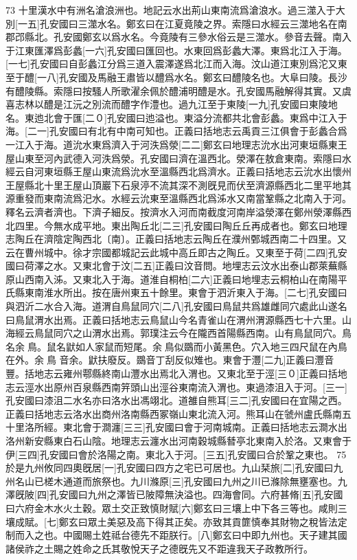 73
十里漢水中有洲名滄浪洲也。地記云水出荊山東南流爲滄浪水。過三澨入于大別[一五]孔安國曰三澨水名。鄭玄曰在江夏竟陵之界。索隱曰水經云三澨地名在南郡邔縣北。孔安國鄭玄以爲水名。今竟陵有三參水俗云是三澨水。參音去聲。南入于江東匯澤爲彭蠡[一六]孔安國曰匯回也。水東回爲彭蠡大澤。東爲北江入于海。[一七]孔安國曰自彭蠡江分爲三道入震澤遂爲北江而入海。汶山道江東別爲沱又東至于醴[一八]孔安國及馬融王肅皆以醴爲水名。鄭玄曰醴陵名也。大阜曰陵。長沙有醴陵縣。索隱曰按騷人所歌濯余佩於醴浦明醴是水。孔安國馬融解得其實。又虞喜志林以醴是江沅之別流而醴字作澧也。過九江至于東陵[一九]孔安國曰東陵地名。東迆北會于匯[二０]孔安國曰迆溢也。東溢分流都共北會彭蠡。東爲中江入于海。[二一]孔安國曰有北有中南可知也。正義曰括地志云禹貢三江俱會于彭蠡合爲一江入于海。道沇水東爲濟入于河泆爲滎[二二]鄭玄曰地理志沇水出河東垣縣東王屋山東至河內武德入河泆爲滎。孔安國曰濟在溫西北。滎澤在敖倉東南。索隱曰水經云自河東垣縣王屋山東流爲沇水至溫縣西北爲濟水。正義曰括地志云沇水出懷州王屋縣北十里王屋山頂巖下石泉渟不流其深不測旣見而伏至濟源縣西北二里平地其源重發而東南流爲汜水。水經云沇東至溫縣西北爲泲水又南當鞏縣之北南入于河。釋名云濟者濟也。下濟子細反。按濟水入河而南截度河南岸溢滎澤在鄭州滎澤縣西北四里。今無水成平地。東出陶丘北[二三]孔安國曰陶丘丘再成者也。鄭玄曰地理志陶丘在濟陰定陶西北〔南〕。正義曰括地志云陶丘在濮州鄄城西南二十四里。又云在曹州城中。徐才宗國都城記云此城中高丘即古之陶丘。又東至于荷[二四]孔安國曰荷澤之水。又東北會于汶[二五]正義曰汶音問。地埋志云汶水出泰山郡萊蕪縣原山西南入泲。又東北入于海。道淮自桐柏[二六]正義曰地埋志云桐柏山在南陽平氏縣東南淮水所出。按在唐州東五十餘里。東會于泗沂東入于海。[二七]孔安國曰與泗沂二水合入海。道渭自鳥鼠同穴[二八]孔安國曰鳥鼠共爲雄雌同穴處此山遂名曰鳥鼠渭水出焉。正義曰括地志云鳥鼠山今名青雀山在渭州渭源縣西七十六里。山海經云鳥鼠同穴之山渭水出焉。郭璞注云今在隴西首陽縣西南。山有鳥鼠同穴。鳥名余鳥。鼠名鼣如人家鼠而短尾。余鳥似鵽而小黃黑色。穴入地三四尺鼠在內鳥在外。余鳥 音余。鼣扶廢反。鵽音丁刮反似雉也。東會于灃[二九]正義曰灃音豐。括地志云雍州鄠縣終南山灃水出焉北入渭也。又東北至于涇[三０]正義曰括地志云涇水出原州百泉縣西南笄頭山出涇谷東南流入渭也。東過漆沮入于河。[三一]孔安國曰漆沮二水名亦曰洛水出馮翊北。道雒自熊耳[三二]孔安國曰在宜陽之西。正義曰括地志云洛水出商州洛南縣西冢嶺山東北流入河。熊耳山在虢州盧氏縣南五十里洛所經。東北會于澗瀍[三三]孔安國曰會于河南城南。正義曰括地志云澗水出洛州新安縣東白石山陰。地理志云瀍水出河南穀城縣朁亭北東南入於洛。又東會于伊[三四]孔安國曰會於洛陽之南。東北入于河。[三五]孔安國曰合於鞏之東也。
75
於是九州攸同四奧旣居[一]孔安國曰四方之宅已可居也。九山栞旅[二]孔安國曰九州名山已槎木通道而旅祭也。九川滌原[三]孔安國曰九州之川已滌除無壅塞也。九澤旣陂[四]孔安國曰九州之澤皆已陂障無決溢也。四海會同。六府甚脩[五]孔安國曰六府金木水火土穀。眾土交正致慎財賦[六]鄭玄曰三壤上中下各三等也。咸則三壤成賦。[七]鄭玄曰眾土美惡及高下得其正矣。亦致其貢篚慎奉其財物之稅皆法定制而入之也。中國賜土姓祗台德先不距朕行。[八]鄭玄曰中即九州也。天子建其國諸侯祚之土賜之姓命之氏其敬悅天子之德旣先又不距違我天子政教所行。
